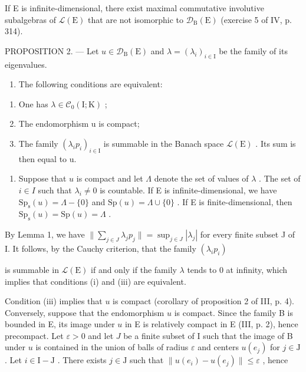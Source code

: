 If E is infinite-dimensional, there exist maximal commutative involutive subalgebras of \(\mathcal{L}(\mathrm{E})\) that are not isomorphic to \(\mathcal{D}_{\mathrm{B}}(\mathrm{E})\) (exercise 5 of IV, p. 314).

PROPOSITION 2. --- Let \(u \in \mathcal{D}_{\mathrm{B}}(\mathrm{E})\) and \(\lambda = (\lambda_i)_{i \in \mathrm{I}}\) be the family of its eigenvalues.

\begin{enumerate}
\def\labelenumi{\alph{enumi})}
\tightlist
\item
  The following conditions are equivalent:
\end{enumerate}

\begin{enumerate}
\def\labelenumi{(\roman{enumi})}
\item
  One has \(\lambda \in \mathcal{C}_{0}(\mathrm{I};\mathrm{K})\) ;
\item
  The endomorphism u is compact;
\item
  The family \((\lambda_{i}p_{i})_{i\in\mathrm{I}}\) is summable in the Banach space \(\mathcal{L}(\mathrm{E})\) . Its sum is then equal to u.
\end{enumerate}

\begin{enumerate}
\def\labelenumi{\alph{enumi})}
\setcounter{enumi}{1}
\tightlist
\item
  Suppose that \(u\) is compact and let \(\Lambda\) denote the set of values of \(\lambda\) . The set of \(i \in I\) such that \(\lambda_i \neq 0\) is countable. If E is infinite-dimensional, we have \(\mathrm{Sp}_{\mathrm{s}}(u) = \Lambda - \{0\}\) and \(\mathrm{Sp}(u) = \Lambda \cup \{0\}\) . If E is finite-dimensional, then \(\mathrm{Sp}_{\mathrm{s}}(u) = \mathrm{Sp}(u) = \Lambda\) .
\end{enumerate}

By Lemma 1, we have \(\| \sum_{j\in J}\lambda_jp_j\| = \sup_{j\in J}|\lambda_j|\) for every finite subset J of I. It follows, by the Cauchy criterion, that the family \((\lambda_ip_i)\)

is summable in \(\mathcal{L}(\mathrm{E})\) if and only if the family \(\lambda\) tends to 0 at infinity, which implies that conditions (i) and (iii) are equivalent.

Condition (iii) implies that \(u\) is compact (corollary of proposition 2 of III, p. 4). Conversely, suppose that the endomorphism \(u\) is compact. Since the family B is bounded in E, its image under \(u\) in E is relatively compact in E (III, p. 2), hence precompact. Let \(\varepsilon > 0\) and let \(J\) be a finite subset of I such that the image of B under \(u\) is contained in the union of balls of radius \(\varepsilon\) and centers \(u(e_j)\) for \(j \in \mathrm{J}\) . Let \(i \in \mathrm{I} - \mathrm{J}\) . There exists \(j \in \mathrm{J}\) such that \(\| u(e_i) - u(e_j) \| \leqslant \varepsilon\) , hence

